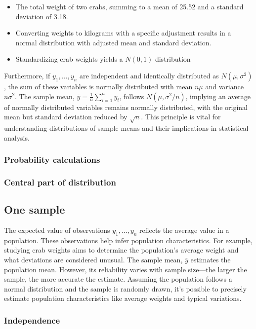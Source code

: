 \documentclass{article}
\begin{document}
\begin{itemize}
    \item The total weight of two crabs, summing to a mean of 25.52 and a standard deviation of 3.18.
    \item Converting weights to kilograms with a specific adjustment results in a normal distribution with adjusted mean and standard deviation.
    \item Standardizing crab weights yields a $N(0,1)$ distribution
\end{itemize}

Furthermore, if $y_1,...,y_n$ are independent and identically distributed as $N(\mu, \sigma^2)$, the sum of these variables is normally distributed with mean $n \mu$ and variance $n \sigma ^2$. The sample mean, $\bar{y} = \frac {1} {n} \sum_{i=1}^{n} y_i$, follows $N(\mu, \sigma ^2 / n)$, implying an average of normally distributed variables remains normally distributed, with the original mean but standard deviation reduced by $\sqrt{n}$. This principle is vital for understanding distributions of sample means and their implications in statistical analysis.

\subsubsection{Probability calculations}

\subsubsection{Central part of distribution}

\subsection{One sample}

The expected value of observations $y_1, ..., y_n$ reflects the average value in a population. These observations help infer population characteristics. For example, studying crab weights aims to determine the population's average weight and what deviations are considered unusual. The sample mean, $\bar y$ estimates the population mean. However, its reliability varies with sample size—the larger the sample, the more accurate the estimate. Assuming the population follows a normal distribution and the sample is randomly drawn, it's possible to precisely estimate population characteristics like average weights and typical variations.

\subsubsection{Independence}
\end{document}
